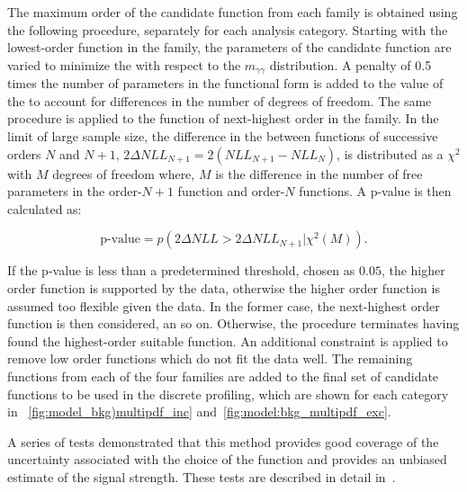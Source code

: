 The maximum order of the candidate function from each family is obtained using the following procedure, separately for each analysis category. Starting with the lowest-order function in the family, the parameters of the candidate function are varied to minimize the \NLL with respect to the $m_{\gamma\gamma}$ distribution. A penalty of 0.5 times the number of parameters in the functional form is added to the value of the \NLL to account for differences in the number of degrees of freedom. The same procedure is applied to the function of next-highest order in the family. 
In the limit of large sample size, the difference in the \NLL between functions of successive orders $N$ and $N+1$, $2 \Delta NLL_{N+1} = 2(NLL_{N+1} - NLL_{N})$, is distributed as a $\chi^2$ with $M$ degrees of freedom where, $M$ is the difference in the number of free parameters in the order-$N+1$ function and order-$N$ functions. A p-value is then calculated as:

$$ \text{p-value} = p(2 \Delta NLL > 2 \Delta NLL_{N+1}| \chi^2(M)). $$

If the p-value is less than a predetermined threshold, chosen as $0.05$, the higher order function is supported by the data, otherwise the higher order function is assumed too flexible given the data. In the former case, the next-highest order function is then considered, an so on. Otherwise, the procedure terminates having found the highest-order suitable function.  An additional constraint is applied to remove low order functions which do not fit the data well. The remaining functions from each of the four families are added to the final set of candidate functions to be used in the discrete profiling, which are shown for each category in \Fig\s~\ref{fig:model_bkg)multipdf_inc} and~\ref{fig:model:bkg_multipdf_exc}.

A series of tests demonstrated that this method provides good coverage of the uncertainty associated with the choice of the function and provides an unbiased estimate of the signal strength. These tests are described in detail in~\cite{DiscreteProfilingMethod}. 

